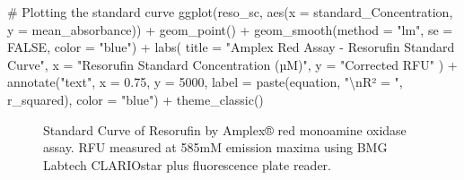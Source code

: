 \documentclass[
  letterpaper,
  DIV=11,
  numbers=noendperiod]{scrreprt}
\newenvironment{Shaded}{\begin{snugshade}}{\end{snugshade}}
\newcommand{\AttributeTok}[1]{\textcolor[rgb]{0.40,0.45,0.13}{#1}}
\newcommand{\CommentTok}[1]{\textcolor[rgb]{0.37,0.37,0.37}{#1}}
\newcommand{\ConstantTok}[1]{\textcolor[rgb]{0.56,0.35,0.01}{#1}}
\newcommand{\DecValTok}[1]{\textcolor[rgb]{0.68,0.00,0.00}{#1}}
\newcommand{\FloatTok}[1]{\textcolor[rgb]{0.68,0.00,0.00}{#1}}
\newcommand{\FunctionTok}[1]{\textcolor[rgb]{0.28,0.35,0.67}{#1}}
\newcommand{\NormalTok}[1]{\textcolor[rgb]{0.00,0.23,0.31}{#1}}
\newcommand{\SpecialCharTok}[1]{\textcolor[rgb]{0.37,0.37,0.37}{#1}}
\newcommand{\StringTok}[1]{\textcolor[rgb]{0.13,0.47,0.30}{#1}}
\begin{document}
\begin{Shaded}
\begin{Highlighting}[]
\CommentTok{\# Plotting the standard curve}
\FunctionTok{ggplot}\NormalTok{(reso\_sc, }\FunctionTok{aes}\NormalTok{(}\AttributeTok{x =}\NormalTok{ standard\_Concentration, }\AttributeTok{y =}\NormalTok{ mean\_absorbance)) }\SpecialCharTok{+}
  \FunctionTok{geom\_point}\NormalTok{() }\SpecialCharTok{+}
  \FunctionTok{geom\_smooth}\NormalTok{(}\AttributeTok{method =} \StringTok{"lm"}\NormalTok{, }\AttributeTok{se =} \ConstantTok{FALSE}\NormalTok{, }\AttributeTok{color =} \StringTok{"blue"}\NormalTok{) }\SpecialCharTok{+}
  \FunctionTok{labs}\NormalTok{(}
    \AttributeTok{title =} \StringTok{"Amplex Red Assay {-} Resorufin Standard Curve"}\NormalTok{,}
    \AttributeTok{x =} \StringTok{"Resorufin Standard Concentration (µM)"}\NormalTok{,}
    \AttributeTok{y =} \StringTok{"Corrected RFU"}
\NormalTok{  ) }\SpecialCharTok{+}
  \FunctionTok{annotate}\NormalTok{(}\StringTok{"text"}\NormalTok{, }\AttributeTok{x =} \FloatTok{0.75}\NormalTok{, }\AttributeTok{y =} \DecValTok{5000}\NormalTok{, }\AttributeTok{label =} \FunctionTok{paste}\NormalTok{(equation, }\StringTok{"}\SpecialCharTok{\textbackslash{}n}\StringTok{R² = "}\NormalTok{, r\_squared), }\AttributeTok{color =} \StringTok{"blue"}\NormalTok{) }\SpecialCharTok{+}
  \FunctionTok{theme\_classic}\NormalTok{()}
\end{Highlighting}
\end{Shaded}

\begin{figure}[H]


\caption{\label{fig-reso-stdcurve}Standard Curve of Resorufin by Amplex®
red monoamine oxidase assay. RFU measured at 585mM emission maxima using
BMG Labtech CLARIOstar plus fluorescence plate reader.}

\end{figure}%
\end{document}
